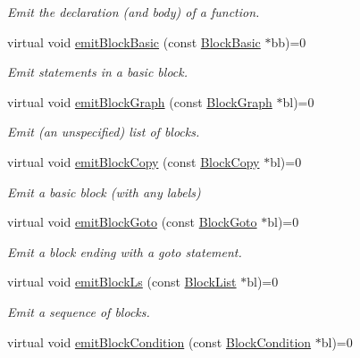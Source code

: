 \begin{DoxyCompactItemize}
\begin{DoxyCompactList}\small\item\em Emit the declaration (and body) of a function. \end{DoxyCompactList}\item 
virtual void \mbox{\hyperlink{class_print_language_a70818723a04d7855897a309284349b03}{emit\+Block\+Basic}} (const \mbox{\hyperlink{class_block_basic}{Block\+Basic}} $\ast$bb)=0
\begin{DoxyCompactList}\small\item\em Emit statements in a basic block. \end{DoxyCompactList}\item 
virtual void \mbox{\hyperlink{class_print_language_a94a1ee0bbfd7e9791439307d9d5f0a84}{emit\+Block\+Graph}} (const \mbox{\hyperlink{class_block_graph}{Block\+Graph}} $\ast$bl)=0
\begin{DoxyCompactList}\small\item\em Emit (an unspecified) list of blocks. \end{DoxyCompactList}\item 
virtual void \mbox{\hyperlink{class_print_language_a64fafed976ae9f3e847ceba8459c51e0}{emit\+Block\+Copy}} (const \mbox{\hyperlink{class_block_copy}{Block\+Copy}} $\ast$bl)=0
\begin{DoxyCompactList}\small\item\em Emit a basic block (with any labels) \end{DoxyCompactList}\item 
virtual void \mbox{\hyperlink{class_print_language_a12683efc57bffe42726244416e519990}{emit\+Block\+Goto}} (const \mbox{\hyperlink{class_block_goto}{Block\+Goto}} $\ast$bl)=0
\begin{DoxyCompactList}\small\item\em Emit a block ending with a goto statement. \end{DoxyCompactList}\item 
virtual void \mbox{\hyperlink{class_print_language_a91b60be4c3dac2b8cc2f36467493d8e6}{emit\+Block\+Ls}} (const \mbox{\hyperlink{class_block_list}{Block\+List}} $\ast$bl)=0
\begin{DoxyCompactList}\small\item\em Emit a sequence of blocks. \end{DoxyCompactList}\item 
virtual void \mbox{\hyperlink{class_print_language_a2c7e3165cd19c1949aaeeb08d4d4c576}{emit\+Block\+Condition}} (const \mbox{\hyperlink{class_block_condition}{Block\+Condition}} $\ast$bl)=0

\end{DoxyCompactItemize}
